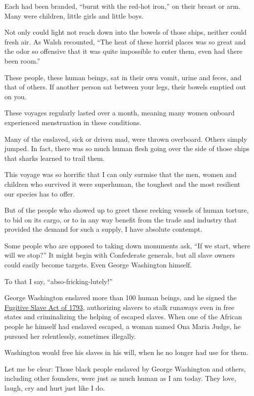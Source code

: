 Each had been branded, ``burnt with the red-hot iron,'' on their breast
or arm. Many were children, little girls and little boys.

Not only could light not reach down into the bowels of those ships,
neither could fresh air. As Walsh recounted, ``The heat of these horrid
places was so great and the odor so offensive that it was quite
impossible to enter them, even had there been room.''

These people, these human beings, sat in their own vomit, urine and
feces, and that of others. If another person sat between your legs,
their bowels emptied out on you.

These voyages regularly lasted over a month, meaning many women onboard
experienced menstruation in these conditions.

Many of the enslaved, sick or driven mad, were thrown overboard. Others
simply jumped. In fact, there was so much human flesh going over the
side of those ships that sharks learned to trail them.

This voyage was so horrific that I can only surmise that the men, women
and children who survived it were superhuman, the toughest and the most
resilient our species has to offer.

But of the people who showed up to greet these reeking vessels of human
torture, to bid on its cargo, or to in any way benefit from the trade
and industry that provided the demand for such a supply, I have absolute
contempt.

Some people who are opposed to taking down monuments ask, ``If we start,
where will we stop?'' It might begin with Confederate generals, but all
slave owners could easily become targets. Even George Washington
himself.

To that I say, ``abso-fricking-lutely!''

George Washington enslaved more than 100 human beings, and he signed the
\href{https://www.history.com/topics/black-history/fugitive-slave-acts}{Fugitive
Slave Act of 1793}, authorizing slavers to stalk runaways even in free
states and criminalizing the helping of escaped slaves. When one of the
African people he himself had enslaved escaped, a woman named Ona Maria
Judge, he pursued her relentlessly, sometimes illegally.

Washington would free his slaves in his will, when he no longer had use
for them.

Let me be clear: Those black people enslaved by George Washington and
others, including other founders, were just as much human as I am today.
They love, laugh, cry and hurt just like I do.


